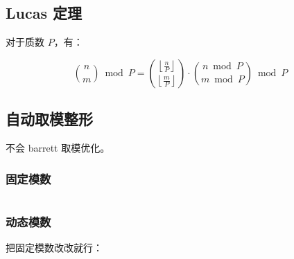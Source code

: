 \inputminted[mathescape]{cpp}{icpc/math/gcd/fast_gcd.cpp}

\subsection{Lucas 定理}

对于质数 $P$，有：

\[
\binom{n}{m}\bmod P =
\binom{\left\lfloor\frac{n}{P}\right\rfloor}{\left\lfloor\frac{m}{P}\right\rfloor}
\cdot \binom{n\bmod P}{m\bmod P}\bmod P
\]

\subsection{自动取模整形}

不会 barrett 取模优化。

\subsubsection{固定模数}

\inputminted{cpp}{icpc/math/modint/static_modint.cpp}

\subsubsection{动态模数}

把固定模数改改就行：

\inputminted{diff}{icpc/math/modint/diff}
